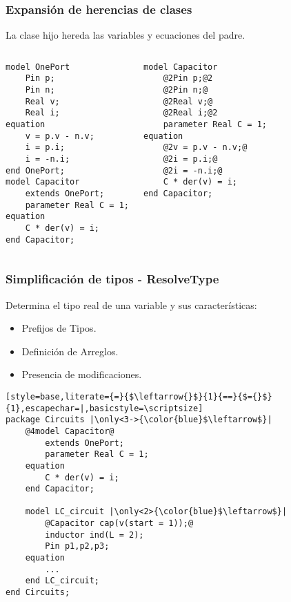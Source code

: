 \begin{frame}[fragile]
\frametitle{Expansión de herencias de clases} 

\begin{block} {}
La clase hijo hereda las variables y ecuaciones del padre.
\end{block}

\pause 
\begin{columns} 
\begin{lstlisting}[style=base,basicstyle=\scriptsize]
model OnePort
    Pin p;
    Pin n;
    Real v;
    Real i;
equation
    v = p.v - n.v;
    i = p.i;
    i = -n.i;
end OnePort;
model Capacitor
    extends OnePort;
    parameter Real C = 1;
equation
    C * der(v) = i;
end Capacitor;
\end{lstlisting} 
\pause
{}  
\begin{lstlisting}[style=base,basicstyle=\scriptsize]
model Capacitor 
    @2Pin p;@2
    @2Pin n;@
    @2Real v;@
    @2Real i;@2
    parameter Real C = 1;
equation
    @2v = p.v - n.v;@
    @2i = p.i;@
    @2i = -n.i;@
    C * der(v) = i;
end Capacitor;
\end{lstlisting}
\end{columns}
\end{frame}


\begin{frame}[fragile]
\frametitle{Simplificación de tipos - ResolveType} 
\begin{block}{}
Determina el tipo real de una variable y sus características: 
\begin{itemize}
    \item Prefijos de Tipos.
    \item Definición de Arreglos. 
    \item Presencia de modificaciones.
\end{itemize}
\end{block}
\pause
\begin{lstlisting}[style=base,literate={=}{$\leftarrow{}$}{1}{==}{$={}$}{1},escapechar=|,basicstyle=\scriptsize]
package Circuits |\only<3->{\color{blue}$\leftarrow$}|
    @4model Capacitor@
        extends OnePort;
        parameter Real C = 1;
    equation
        C * der(v) = i;
    end Capacitor;
    
    model LC_circuit |\only<2>{\color{blue}$\leftarrow$}|
        @Capacitor cap(v(start = 1));@
        inductor ind(L = 2);
        Pin p1,p2,p3;
    equation
        ...
    end LC_circuit;
end Circuits;
\end{lstlisting}
\end{frame}


